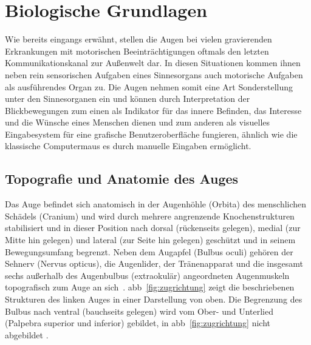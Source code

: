 \section{Biologische Grundlagen}
\label{section:informationstransfer}
Wie bereits eingangs erwähnt, stellen die Augen bei vielen gravierenden Erkrankungen mit motorischen Beeinträchtigungen oftmals den letzten Kommunikationskanal zur Außenwelt dar. In diesen Situationen kommen ihnen neben rein sensorischen Aufgaben eines Sinnesorgans auch motorische Aufgaben als ausführendes Organ zu. Die Augen nehmen somit eine Art Sonderstellung unter den Sinnesorganen ein und können durch Interpretation der Blickbewegungen zum einen als Indikator für das innere Befinden, das Interesse und die Wünsche eines Menschen dienen und zum anderen als visuelles Eingabesystem für eine grafische Benutzeroberfläche fungieren, ähnlich wie die klassische Computermaus es durch manuelle Eingaben ermöglicht. 


\subsection{Topografie und Anatomie des Auges}
\label{subsect:topgraf}
Das Auge befindet sich anatomisch in der Augenhöhle (Orbita) des menschlichen Schädels (Cranium) und wird durch mehrere angrenzende Knochenstrukturen stabilisiert und in dieser Position nach dorsal (rückenseits gelegen), medial (zur Mitte hin gelegen) und lateral (zur Seite hin gelegen) geschützt und in seinem Bewegungsumfang begrenzt. Neben dem Augapfel (Bulbus oculi) gehören der Sehnerv (Nervus opticus), die Augenlider, der Tränenapparat und die insgesamt sechs außerhalb des Augenbulbus (extraokulär) angeordneten Augenmuskeln topografisch zum Auge an sich~\cite{Krahn2011}. \acl{abb}~\ref{fig:zugrichtung} zeigt die beschriebenen Strukturen des linken Auges in einer Darstellung von oben. Die Begrenzung des Bulbus nach ventral (bauchseits gelegen) wird vom Ober- und Unterlied (Palpebra superior und inferior) gebildet, in \acs{abb}~\ref{fig:zugrichtung} nicht abgebildet \cite{Krahn2011}. 

